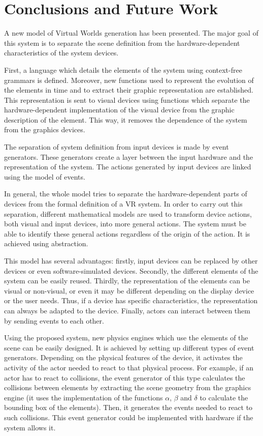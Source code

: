 \documentclass[10pt,journal,letterpaper,compsoc]{IEEEtran}
\begin{document}
\section{Conclusions and Future Work
\label{sec:conclusions}}

A new model of Virtual Worlds generation has been presented. The major goal of this system is to
separate the scene definition from the hardware-dependent characteristics of the system devices.

First, a language which details the elements of the system using context-free grammars is defined.
Moreover, new functions used to represent the evolution of the elements in time and to extract
their graphic representation are established. This representation is sent to visual devices using
functions which separate the  hardware-dependent implementation of the visual device from the
graphic description of the element. This way, it removes the dependence of the system from the
graphics devices.

The separation of system definition from input devices is made by event generators. These
generators create a layer between the input hardware and the representation of the system. The
actions generated by input devices are linked using the model of events.

In general, the whole model tries to separate the hardware-dependent parts of devices from the
formal definition of a VR system. In order to carry out this separation, different mathematical
models are used to transform device actions, both visual and input devices, into more general
actions. The system must be able to identify these general actions regardless of the origin of the
action. It is achieved using abstraction.

This model has several advantages: firstly, input devices can be replaced by other devices or even
software-simulated devices. Secondly, the different elements of the system can be easily reused.
Thirdly, the representation of the elements can be visual or non-visual, or even it may be
different depending on the display device or the user needs. Thus, if a device has specific
characteristics, the representation can always be adapted to the device. Finally, actors can
interact between them by sending events to each other.

Using the proposed system, new physics engines which use the elements of the scene can be easily
designed. It is achieved by setting up different types of event generators. Depending on the
physical features of the device, it activates the activity of the actor needed to react to that
physical process. For example, if an actor has to react to collisions, the event generator of this
type calculates the collisions between elements by extracting the scene geometry from the graphics
engine (it uses the implementation of the functions $\alpha$, $\beta$ and $\delta$ to calculate the
bounding box of the elements). Then, it generates the events needed to react to such collisions.
This event generator could be implemented with hardware if the system allows it.
\end{document}
